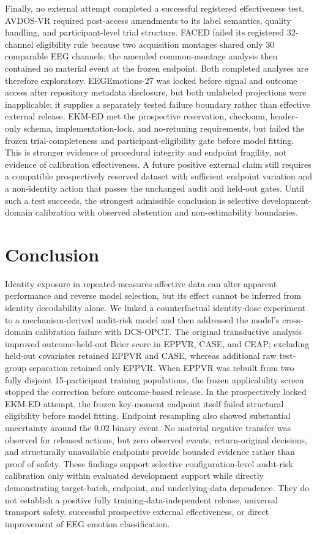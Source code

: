 \documentclass[preprint,12pt]{elsarticle}
\begin{document}
Finally, no external attempt completed a successful registered effectiveness test. AVDOS-VR required post-access amendments to its label semantics, quality handling, and participant-level trial structure. FACED failed its registered 32-channel eligibility rule because two acquisition montages shared only 30 comparable EEG channels; the amended common-montage analysis then contained no material event at the frozen endpoint. Both completed analyses are therefore exploratory. EEGEmotions-27 was locked before signal and outcome access after repository metadata disclosure, but both unlabeled projections were inapplicable; it supplies a separately tested failure boundary rather than effective external release. EKM-ED met the prospective reservation, checksum, header-only schema, implementation-lock, and no-retuning requirements, but failed the frozen trial-completeness and participant-eligibility gate before model fitting. This is stronger evidence of procedural integrity and endpoint fragility, not evidence of calibration effectiveness. A future positive external claim still requires a compatible prospectively reserved dataset with sufficient endpoint variation and a non-identity action that passes the unchanged audit and held-out gates. Until such a test succeeds, the strongest admissible conclusion is selective development-domain calibration with observed abstention and non-estimability boundaries.

\section{Conclusion}

Identity exposure in repeated-measures affective data can alter apparent performance and reverse model selection, but its effect cannot be inferred from identity decodability alone. We linked a counterfactual identity-dose experiment to a mechanism-derived audit-risk model and then addressed the model's cross-domain calibration failure with DCS-OPCT. The original transductive analysis improved outcome-held-out Brier score in EPPVR, CASE, and CEAP; excluding held-out covariates retained EPPVR and CASE, whereas additional raw test-group separation retained only EPPVR. When EPPVR was rebuilt from two fully disjoint 15-participant training populations, the frozen applicability screen stopped the correction before outcome-based release. In the prospectively locked EKM-ED attempt, the frozen key-moment endpoint itself failed structural eligibility before model fitting. Endpoint resampling also showed substantial uncertainty around the 0.02 binary event. No material negative transfer was observed for released actions, but zero observed events, return-original decisions, and structurally unavailable endpoints provide bounded evidence rather than proof of safety. These findings support selective configuration-level audit-risk calibration only within evaluated development support while directly demonstrating target-batch, endpoint, and underlying-data dependence. They do not establish a positive fully training-data-independent release, universal transport safety, successful prospective external effectiveness, or direct improvement of EEG emotion classification.
\end{document}

